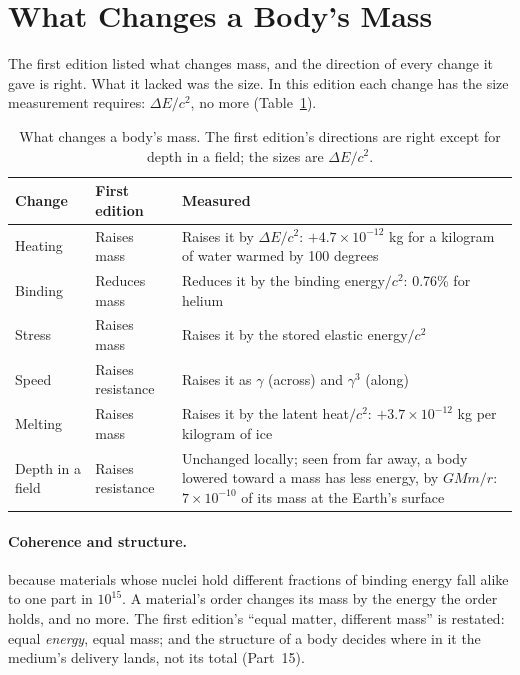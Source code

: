 \documentclass[11pt,a4paper]{article}
\begin{document}
\section{What Changes a Body's Mass}
\label{sec:changes}

The first edition listed what changes mass, and the direction of every change it gave is right. What it lacked was the size. In this edition each change has the size measurement requires: $\Delta E/c^2$, no more (Table~\ref{tab:changes}).

\begin{table}[H]
\centering
\small
\renewcommand{\arraystretch}{1.25}
\begin{tabular}{@{}>{\raggedright\arraybackslash}p{}>{\raggedright\arraybackslash}p{}>{\raggedright\arraybackslash}p{}@{}}
\toprule
\textbf{Change} & \textbf{First edition} & \textbf{Measured} \\
\midrule
Heating & Raises mass & Raises it by $\Delta E/c^2$: $+4.7\times10^{-12}$ kg for a kilogram of water warmed by 100 degrees \\
Binding & Reduces mass & Reduces it by the binding energy$/c^2$: 0.76\% for helium \\
Stress & Raises mass & Raises it by the stored elastic energy$/c^2$ \\
Speed & Raises resistance & Raises it as $\gamma$ (across) and $\gamma^3$ (along) \\
Melting & Raises mass & Raises it by the latent heat$/c^2$: $+3.7\times10^{-12}$ kg per kilogram of ice \\
Depth in a field & Raises resistance & Unchanged locally; seen from far away, a body lowered toward a mass has less energy, by $GMm/r$: $7\times10^{-10}$ of its mass at the Earth's surface \\
\bottomrule
\end{tabular}
\caption{What changes a body's mass. The first edition's directions are right except for depth in a field; the sizes are $\Delta E/c^2$.}
\label{tab:changes}
\end{table}

\paragraph{Coherence and structure.}  because materials whose nuclei hold different fractions of binding energy fall alike to one part in $10^{15}$. A material's order changes its mass by the energy the order holds, and no more. The first edition's ``equal matter, different mass'' is restated: equal \emph{energy}, equal mass; and the structure of a body decides where in it the medium's delivery lands, not its total (Part~15).
\end{document}
